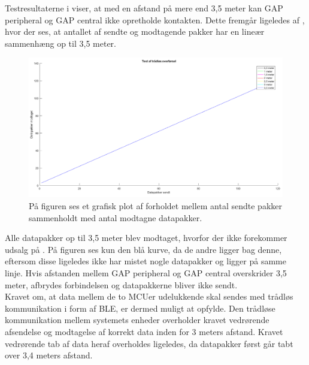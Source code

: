 Testresultaterne i  viser, at med en afstand på mere end 3,5 meter kan GAP peripheral og GAP central ikke opretholde kontakten. Dette fremgår ligeledes af , hvor der ses, at antallet af sendte og modtagende pakker har en lineær sammenhæng op til 3,5 meter.
\begin{figure}[H]
	\centering
	\includegraphics[scale=0.35]{figures/cDesign/test_ble.png}
	\caption{På figuren ses et grafisk plot af forholdet mellem antal sendte pakker sammenholdt med antal modtagne datapakker. }
	\label{fig:test_ble}
\end{figure}
Alle datapakker op til 3,5 meter blev modtaget, hvorfor der ikke forekommer udsalg på . På figuren ses kun den blå kurve, da de andre ligger bag denne, eftersom disse ligeledes ikke har mistet nogle datapakker og ligger på samme linje. Hvis afstanden mellem GAP peripheral og GAP central overskrider 3,5 meter, afbrydes forbindelsen og datapakkerne bliver ikke sendt. \\
Kravet om, at data mellem de to MCUer udelukkende skal sendes med trådløs kommunikation i form af BLE, er dermed muligt at opfylde. Den trådløse kommunikation mellem systemets enheder overholder kravet vedrørende afsendelse og modtagelse af korrekt data inden for 3 meters afstand. Kravet vedrørende tab af data heraf overholdes ligeledes, da datapakker først går tabt over 3,4 meters afstand.
